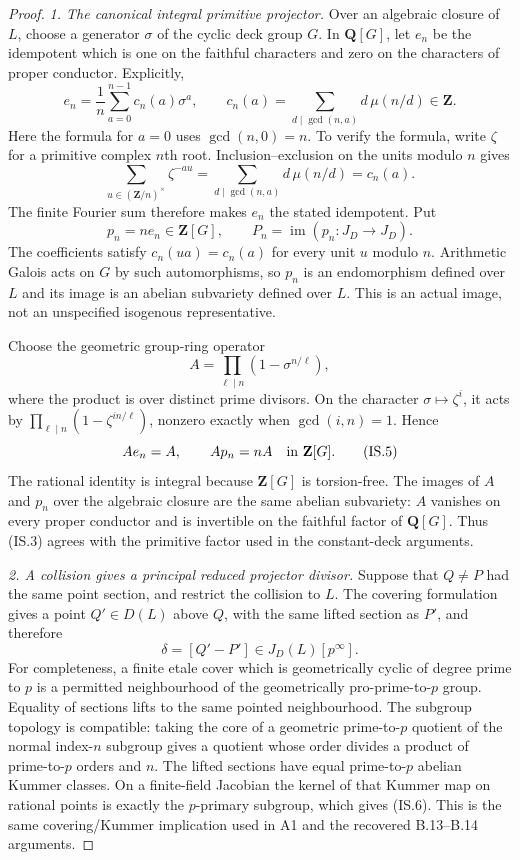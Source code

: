 \begin{proof}
\emph{1. The canonical integral primitive projector.}
Over an algebraic closure of $L$, choose a generator $\sigma$
of the cyclic deck group $G$. In $\mathbf Q[G]$, let $e_n$
be the idempotent which is one on the faithful characters and
zero on the characters of proper conductor. Explicitly,
\[
 e_n=\frac1n\sum_{a=0}^{n-1}c_n(a)\sigma^a,
 \qquad
 c_n(a)=\sum_{d\mid\gcd(n,a)}d\,\mu(n/d)\in\mathbf Z.
 \tag{IS.2}
\]
Here the formula for $a=0$ uses $\gcd(n,0)=n$.
To verify the formula, write $\zeta$ for a primitive complex
$n$th root. Inclusion--exclusion on the units modulo $n$ gives
\[
 \sum_{u\in(\mathbf Z/n)^\times}\zeta^{-au}
       =\sum_{d\mid\gcd(n,a)}d\,\mu(n/d)=c_n(a).
\]
The finite Fourier sum therefore makes $e_n$ the stated
idempotent. Put
\[
        p_n=ne_n\in\mathbf Z[G],\qquad
        P_n=\operatorname{im}(p_n:J_D\longrightarrow J_D).
 \tag{IS.3}
\]
The coefficients satisfy $c_n(ua)=c_n(a)$ for every unit $u$
modulo $n$. Arithmetic Galois acts on $G$ by such automorphisms,
so $p_n$ is an endomorphism defined over $L$ and its image is an
abelian subvariety defined over $L$. This is an actual image,
not an unspecified isogenous representative.

Choose the geometric group-ring operator
\[
                 A=\prod_{\ell\mid n}(1-\sigma^{n/\ell}),
 \tag{IS.4}
\]
where the product is over distinct prime divisors. On the
character $\sigma\mapsto\zeta^i$, it acts by
$\prod_{\ell\mid n}(1-\zeta^{i n/\ell})$, nonzero exactly
when $\gcd(i,n)=1$. Hence
\[
                  Ae_n=A,\qquad Ap_n=nA
                       \quad\hbox{in }\mathbf Z[G].
 \tag{IS.5}
\]
The rational identity is integral because $\mathbf Z[G]$
is torsion-free. The images of $A$ and $p_n$ over the algebraic
closure are the same abelian subvariety: $A$ vanishes on every
proper conductor and is invertible on the faithful factor of
$\mathbf Q[G]$. Thus (IS.3) agrees with the primitive factor
used in the constant-deck arguments.

\emph{2. A collision gives a principal reduced projector divisor.}
Suppose that $Q\ne P$ had the same point section, and restrict
the collision to $L$. The covering formulation gives a point
$Q'\in D(L)$ above $Q$, with the same lifted section as $P'$,
and therefore
\[
                        \delta=[Q'-P']
                              \in J_D(L)[p^\infty].
 \tag{IS.6}
\]
For completeness, a finite etale cover which is geometrically
cyclic of degree prime to $p$ is a permitted neighbourhood of
the geometrically pro-prime-to-$p$ group. Equality of sections
lifts to the same pointed neighbourhood. The subgroup topology
is compatible: taking the core of a geometric prime-to-$p$
quotient of the normal index-$n$ subgroup gives a quotient
whose order divides a product of prime-to-$p$ orders and $n$.
The lifted sections have equal prime-to-$p$ abelian Kummer
classes. On a finite-field Jacobian the kernel of that Kummer
map on rational points is exactly the $p$-primary subgroup,
which gives (IS.6). This is the same covering/Kummer implication
used in A1 and the recovered B.13--B.14 arguments.


\end{proof}
